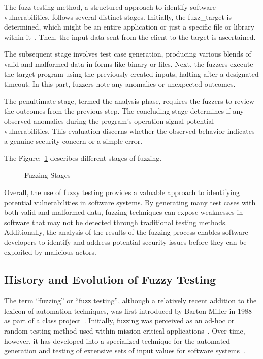The fuzz testing method, a structured approach to identify software vulnerabilities,
follows several distinct stages. Initially, the \gls{fuzz_target} is determined, which
might be an entire application or just a specific file or library within it~\cite{segedyfuzz}.
Then, the input data sent from the client to the target is ascertained.

The subsequent stage involves test case generation, producing various blends of
valid and malformed data in forms like binary or files. Next, the fuzzers
execute the target program using the previously created inputs, halting after a
designated timeout. In this part, fuzzers note any anomalies or unexpected outcomes.

The penultimate stage, termed the analysis phase, requires the fuzzers to review the
outcomes from the previous step. The concluding stage determines if any observed anomalies
during the program's operation signal potential vulnerabilities. This evaluation discerns
whether the observed behavior indicates a genuine security concern or a simple error.

The Figure:~\ref{fig:fuzzy_testing_phases_1} describes different stages of fuzzing.

\begin{figure}[h]
        \centering
        \caption{Fuzzing Stages~\cite{segedyfuzz}~\cite{9742291}}\label{fig:fuzzy_testing_phases_1}
\end{figure}

Overall, the use of fuzzy testing provides a valuable approach to identifying potential
vulnerabilities in software systems. By generating many test cases with both
valid and malformed data, fuzzing techniques can expose weaknesses in software that may not be
detected through traditional testing methods. Additionally, the analysis of the results of the
fuzzing process enables software developers to identify and address potential security issues
before they can be exploited by malicious actors.

\subsection{History and Evolution of Fuzzy Testing}
The term ``fuzzing'' or ``fuzz testing'', although a relatively recent addition
to the lexicon of automation techniques, was first introduced by Barton Miller
in 1988 as part of a class project~\cite{takanen2009fuzzing}. Initially,
fuzzing was perceived as an ad-hoc or random testing method used within
mission-critical applications~\cite{WhatisaM24:online}. Over time, however, it
has developed into a specialized technique for the automated generation and
testing of extensive sets of input values for software systems~\cite{bohme2020fuzzing}.

